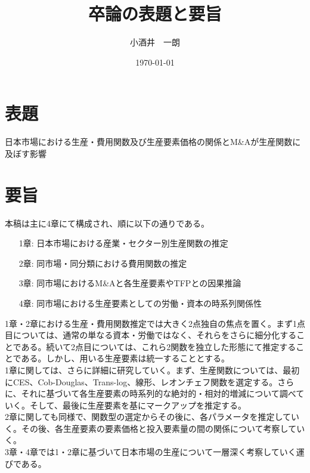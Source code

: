 \documentclass[dvipdfmx, uplatex]{jsarticle}
\title{卒論の表題と要旨}
\author{小酒井　一朗}
\date{\today}
\begin{document}
\maketitle
\section{表題}
日本市場における生産・費用関数及び生産要素価格の関係とM\&Aが生産関数に及ぼす影響

\section{要旨}
本稿は主に4章にて構成され、順に以下の通りである。
\begin{itemize}
    \item[1章:] 日本市場における産業・セクター別生産関数の推定
    \item[2章:] 同市場・同分類における費用関数の推定
    \item[3章:] 同市場におけるM\&Aと各生産要素やTFPとの因果推論
    \item[4章:] 同市場における生産要素としての労働・資本の時系列関係性
\end{itemize}
1章・2章における生産・費用関数推定では大きく2点独自の焦点を置く。まず1点目については、通常の単なる資本・労働ではなく、それらをさらに細分化することである。続いて2点目については、これら2関数を独立した形態にて推定することである。しかし、用いる生産要素は統一することとする。\\
1章に関しては、さらに詳細に研究していく。まず、生産関数については、最初にCES、Cob-Douglas、Trans-log、線形、レオンチェフ関数を選定する。さらに、それに基づいて各生産要素の時系列的な絶対的・相対的増減について調べていく。そして、最後に生産要素を基にマークアップを推定する。\\
2章に関しても同様で、関数型の選定からその後に、各パラメータを推定していく。その後、各生産要素の要素価格と投入要素量の間の関係について考察していく。\\
3章・4章では1・2章に基づいて日本市場の生産について一層深く考察していく運びである。
\end{document}
